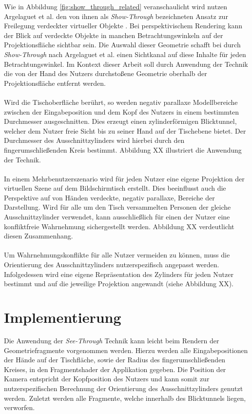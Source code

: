 Wie in Abbildung \ref{fig:show_through_related} veranschaulicht wird nutzen Argelaguet et al. den von ihnen als \emph{Show-Through} bezeichneten Ansatz zur Freilegung verdeckter virtueller Objekte \cite{argelaguet:2010}. Bei perspektivischem Rendering kann der Blick auf verdeckte Objekte in manchen Betrachtungswinkeln auf der Projektionsfläche sichtbar sein. Die Auswahl dieser Geometrie schafft bei durch \emph{Show-Through} nach Argelaguet et al. einen Sichtkanal auf diese Inhalte für jeden Betrachtungswinkel. Im Kontext dieser Arbeit soll durch Anwendung der Technik die von der Hand des Nutzers durchstoßene Geometrie oberhalb der Projektionsfläche entfernt werden.
\\\\ 
Wird die Tischoberfläche berührt, so werden negativ parallaxe Modellbereiche zwischen der Eingabeposition und dem Kopf des Nutzers in einem bestimmten Durchmesser ausgeschnitten. Dies erzeugt einen zylinderförmigen Blicktunnel, welcher dem Nutzer freie Sicht bis zu seiner Hand auf der Tischebene bietet. Der Durchmesser des Ausschnittzylinders wird hierbei durch den fingerumschließenden Kreis bestimmt. Abbildung XX illustriert die Anwendung der Technik.
\\\\
In einem Mehrbenutzerszenario wird für jeden Nutzer eine eigene Projektion der virtuellen Szene auf dem Bildschirmtisch erstellt. Dies beeinflusst auch die Perspektive auf von Händen verdeckte, negativ parallaxe, Bereiche der Darstellung. Wird für alle um den Tisch versammelten Personen der gleiche Ausschnittzylinder verwendet, kann ausschließlich für einen der Nutzer eine konfliktfreie Wahrnehmung sichergestellt werden. Abbildung XX verdeutlicht diesen Zusammenhang.
\\\\
Um Wahrnehmungskonflikte für alle Nutzer vermeiden zu können, muss die Orientierung des Ausschnittzylinders nutzerspezifisch angepasst werden. Infolgedessen wird eine eigene Repräsentation des Zylinders für jeden Nutzer bestimmt und auf die jeweilige Projektion angewandt (siehe Abbildung XX).


\section{Implementierung}
\label{sec:implementierung_freischneiden}

Die Anwendung der \emph{See-Through} Technik kann leicht beim Rendern der Geometriefragmente vorgenommen werden. Hierzu werden alle Eingabepositionen der Hände auf der Tischfläche, sowie der Radius des fingerumschließenden Kreises, in den Fragmentshader der Applikation gegeben. Die Position der Kamera entspricht der Kopfposition des Nutzers und kann somit zur nutzerspezifischen Berechnung der Orientierung des Ausschnittzylinders genutzt werden. Zuletzt werden alle Fragmente, welche innerhalb des Blicktunnels liegen, verworfen.


